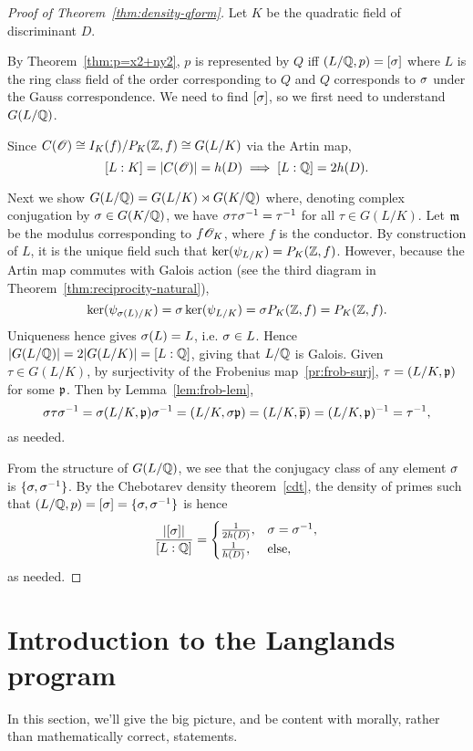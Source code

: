 \begin{proof}[Proof of Theorem~\ref{thm:density-qform}]
Let $K$ be the quadratic field of discriminant $D$.

By Theorem~\ref{thm:p=x2+ny2}, $p$ is represented by $Q$ iff $(L/\mathbb{Q},p)=[\sigma]$ where $L$ is the ring class field of the order corresponding to $Q$ and $Q$ corresponds to $\sigma$ under the Gauss correspondence. We need to find $[\sigma]$, so we first need to understand $G(L/\mathbb{Q})$.

Since $C(\mathscr{O})\cong I_K(f)/P_K(\mathbb{Z},f)\cong G(L/K)$ via the Artin map,
\[
[L:K]=|C(\mathscr{O})|=h(D)\implies [L:\mathbb{Q}]=2h(D).
\]

Next we show $G(L/\mathbb{Q})=G(L/K)\rtimes G(K/\mathbb{Q})$ where, denoting complex conjugation by $\sigma\in G(K/\mathbb{Q})$, we have $\sigma\tau\sigma^{-1}=\tau^{-1}$ for all $\tau\in G(L/K)$. Let $\mathfrak{m}$ be the modulus corresponding to $f\mathscr{O}_K$, where $f$ is the conductor. By construction of $L$, it is the unique field such that $\ker(\psi_{L/K})=P_K(\mathbb{Z},f)$. However, because the Artin map commutes with Galois action (see the third diagram in Theorem~\ref{thm:reciprocity-natural}),
\[
\ker(\psi_{\sigma(L)/K})=\sigma\ker(\psi_{L/K})=\sigma P_K(\mathbb{Z},f)=P_K(\mathbb{Z},f).
\]
Uniqueness hence gives $\sigma(L)=L$, i.e. $\sigma\in L$. Hence $|G(L/\mathbb{Q})|=2|G(L/K)|=[L:\mathbb{Q}]$, giving that $L/\mathbb{Q}$ is Galois. 
Given $\tau\in G(L/K)$, by surjectivity of the Frobenius map~\ref{pr:frob-surj}, $\tau=(L/K,\mathfrak{p})$ for some $\mathfrak{p}$. Then by Lemma~\ref{lem:frob-lem},
\[
\sigma\tau\sigma^{-1}=\sigma(L/K,\mathfrak{p})\sigma^{-1}=(L/K,\sigma\mathfrak{p})=(L/K,\overline{\mathfrak{p}})=(L/K,\mathfrak{p})^{-1}=\tau^{-1},
\]
as needed.

From the structure of $G(L/\mathbb{Q})$, we see that the conjugacy class of any element $\sigma$ is $\{\sigma,\sigma^{-1}\}$. By the Chebotarev density theorem~\ref{cdt}, the density of primes such that $(L/\mathbb{Q},p)=[\sigma]=\{\sigma,\sigma^{-1}\}$ is hence
\[
\frac{|[\sigma]|}{[L:\mathbb{Q}]}=
\begin{cases}
\frac{1}{2h(D)},& \sigma=\sigma^{-1},\\
\frac{1}{h(D)},&\text{else},
\end{cases}
\]
as needed.
\end{proof}
\section{Introduction to the Langlands program}
In this section, we'll give the big picture, and be content with morally, rather than mathematically correct, statements.

